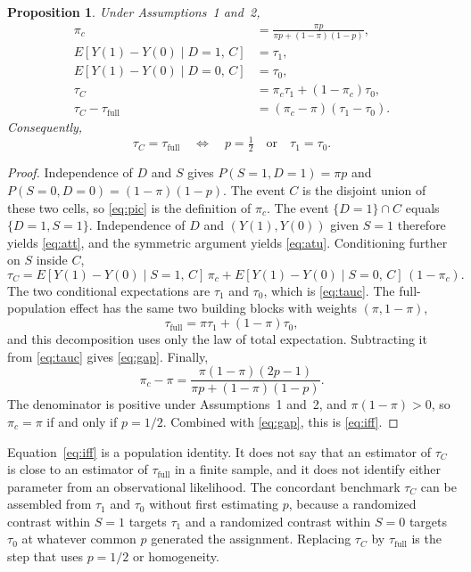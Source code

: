 \documentclass[11pt]{article}
\newtheorem{proposition}{Proposition}
\theoremstyle{remark}
\begin{document}
\begin{proposition}
\label{prop:concordant}
Under Assumptions~1 and~2,
\begin{align}
\pi_c
&=
\frac{\pi p}{\pi p+(1-\pi)(1-p)},
\label{eq:pic}\\
E[Y(1)-Y(0)\mid D=1,\,C]
&=
\tau_1,
\label{eq:att}\\
E[Y(1)-Y(0)\mid D=0,\,C]
&=
\tau_0,
\label{eq:atu}\\
\tau_C
&=
\pi_c\tau_1+(1-\pi_c)\tau_0,
\label{eq:tauc}\\
\tau_C-\tau_{\mathrm{full}}
&=
(\pi_c-\pi)(\tau_1-\tau_0).
\label{eq:gap}
\end{align}
Consequently,
\begin{equation}
\tau_C=\tau_{\mathrm{full}}
\quad\Longleftrightarrow\quad
p=\tfrac12
\quad\text{or}\quad
\tau_1=\tau_0.
\label{eq:iff}
\end{equation}
\end{proposition}

\begin{proof}
Independence of $D$ and $S$ gives $P(S=1,D=1)=\pi p$ and $P(S=0,D=0)=(1-\pi)(1-p)$. The event $C$ is the disjoint union of these two cells, so \eqref{eq:pic} is the definition of $\pi_c$. The event $\{D=1\}\cap C$ equals $\{D=1,S=1\}$. Independence of $D$ and $(Y(1),Y(0))$ given $S=1$ therefore yields \eqref{eq:att}, and the symmetric argument yields \eqref{eq:atu}. Conditioning further on $S$ inside $C$,
\[
\tau_C
=
E[Y(1)-Y(0)\mid S=1,\,C]\,\pi_c
+
E[Y(1)-Y(0)\mid S=0,\,C]\,(1-\pi_c).
\]
The two conditional expectations are $\tau_1$ and $\tau_0$, which is \eqref{eq:tauc}. The full-population effect has the same two building blocks with weights $(\pi,1-\pi)$,
\[
\tau_{\mathrm{full}}=\pi\tau_1+(1-\pi)\tau_0,
\]
and this decomposition uses only the law of total expectation. Subtracting it from \eqref{eq:tauc} gives \eqref{eq:gap}. Finally,
\[
\pi_c-\pi
=
\frac{\pi(1-\pi)(2p-1)}{\pi p+(1-\pi)(1-p)}.
\]
The denominator is positive under Assumptions~1 and~2, and $\pi(1-\pi)>0$, so $\pi_c=\pi$ if and only if $p=1/2$. Combined with \eqref{eq:gap}, this is \eqref{eq:iff}.
\end{proof}

Equation~\eqref{eq:iff} is a population identity. It does not say that an estimator of $\tau_C$ is close to an estimator of $\tau_{\mathrm{full}}$ in a finite sample, and it does not identify either parameter from an observational likelihood. The concordant benchmark $\tau_C$ can be assembled from $\tau_1$ and $\tau_0$ without first estimating $p$, because a randomized contrast within $S=1$ targets $\tau_1$ and a randomized contrast within $S=0$ targets $\tau_0$ at whatever common $p$ generated the assignment. Replacing $\tau_C$ by $\tau_{\mathrm{full}}$ is the step that uses $p=1/2$ or homogeneity.
\end{document}
